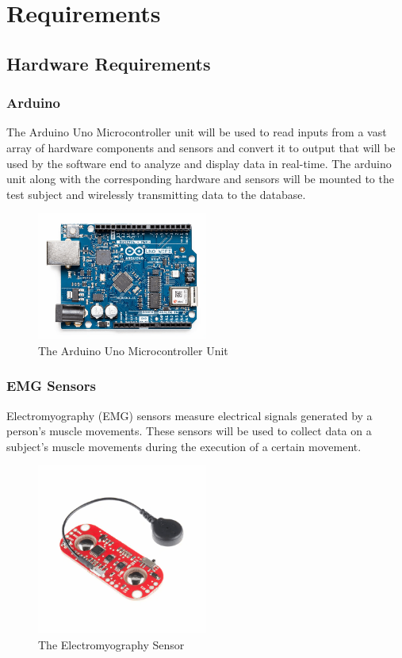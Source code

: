 \section{Requirements}
\subsection{Hardware Requirements}
\subsubsection{Arduino}
The Arduino Uno Microcontroller unit will be used to read inputs from a vast array of hardware components and sensors and convert it to output that will be used by the software end to analyze and display data in real-time. The arduino unit along with the corresponding hardware and sensors will be mounted to the test subject and wirelessly transmitting data to the database. 

\begin{figure}[htbp]
\centering
\includegraphics[width=0.5\textwidth]{Project_Proposal/figs/arduino_uno.png}
\caption{The Arduino Uno Microcontroller Unit \cite{3}}
\label{fig:arduino}
\end{figure}
\subsubsection{EMG Sensors}
Electromyography (EMG) sensors measure electrical signals generated by a person’s muscle movements. These sensors will be used to collect data on a subject’s muscle movements during the execution of a certain movement.
\begin{figure}[htbp]
\centering
\includegraphics[width=0.5\textwidth]{Project_Proposal/figs/MFG_SEN-13723.png}
\caption{The Electromyography Sensor \cite{8}}
\label{fig:emg}
\end{figure}
